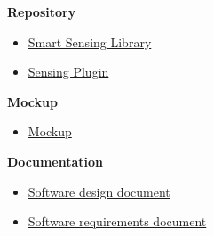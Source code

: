 \documentclass[12pt]{article}
\begin{document}
\textbf{Repository}
    \begin{itemize}
        \item \href{https://gitlab.uni-ulm.de/se-anwendungsprojekt-22-23/smart-sensing-librar}{Smart Sensing Library}
        \item \href{https://gitlab.uni-ulm.de/se-anwendungsprojekt-22-23/sensing-pluginr}{Sensing Plugin}
    \end{itemize}
 \textbf{Mockup}   
    \begin{itemize}
        \item \href{https://gitlab.uni-ulm.de/se-anwendungsprojekt-22-23/documentation/-/tree/master/Mockup}{Mockup}
    \end{itemize}
\textbf{Documentation}
\begin{itemize}
    \item \href{https://gitlab.uni-ulm.de/se-anwendungsprojekt-22-23/documentation/-/blob/master/Software%20design%20document/design_doc.pdf}{Software design document}
    \item \href{https://gitlab.uni-ulm.de/se-anwendungsprojekt-22-23/documentation/-/blob/master/Software%20requirements%20document/SRD.pdf}{Software requirements document}
\end{itemize}

    
 
\end{document}
